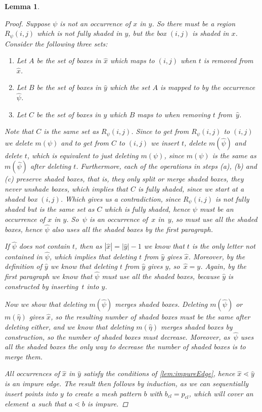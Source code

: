 \documentclass[preprint,11pt]{elsarticle}
\newtheorem{lem}[thm]{Lemma}\crefname{lem}{Lemma}{Lemmas}
\newcommand\cl[1]{#1_{cl}}
\numberwithin{equation}{section}
\numberwithin{figure}{section}
\numberwithin{thm}{section}
\begin{document}
\begin{lem}
\begin{proof}
Suppose $\psi$ is not an occurrence of $x$ in $y$. So there must be a region $R_\psi(i,j)$ which is not fully shaded in $y$,
 but the box $(i,j)$ is shaded in $x$. Consider the following three sets:
 \begin{enumerate}
 \item[(a)] Let $A$ be the set of boxes in $\hat{x}$ which maps to $(i,j)$ when $t$ is removed from $\hat{x}$. 
 \item[(b)] Let $B$ be the set of boxes in $\hat{y}$ which the set $A$ is mapped to by the occurrence $\hat{\psi}$.
 \item[(c)] Let $C$ be the set of boxes in $y$ which $B$ maps to when removing $t$ from~$\hat{y}$.
 \end{enumerate}
 Note that $C$ is the same set as $R_\psi(i,j)$. Since to get from $R_\psi(i,j)$ to $(i,j)$ we delete $m(\psi)$
 and to get from $C$ to $(i,j)$ we insert $t$, delete $m(\hat{\psi})$ and delete $t$,
 which is equivalent to just deleting $m(\psi)$, since $m(\psi)$ is the same as $m(\hat{\psi})$ after deleting $t$.
 Furthermore, each of the operations in steps (a), (b) and (c) preserve shaded boxes, that is, they only split or merge shaded boxes, they never unshade
 boxes, which implies that $C$ is fully shaded, since we start at a shaded box $(i,j)$. Which gives us a contradiction, since $R_\psi(i,j)$ is not fully shaded
 but is the same set as $C$ which is fully shaded, hence $\psi$ must be an occurrence of $x$ in $y$.
 So~$\psi$ is an occurrence of~$x$ in~$y$, so must use all the shaded boxes, hence $\hat{\psi}$ also uses
 all the shaded boxes by the first paragraph.

If $\hat{\psi}$ does not contain $t$, then as $|\hat{x}|=|\hat{y}|-1$ we know that $t$ is the only letter not contained in $\hat{\psi}$,
 which implies that deleting $t$ from $\hat{y}$ gives	
 $\hat{x}$. Moreover, by the definition of $\hat{y}$ we know that deleting $t$ from $\hat{y}$ gives $y$, so~$\hat{x}=y$. Again, by the first paragraph
 we know that $\hat{\psi}$ must use all the shaded boxes, because $\hat{y}$ is constructed by inserting~$t$ into $y$.

Now we show that deleting $m(\hat{\psi})$ merges shaded boxes. Deleting $m(\hat{\psi})$ or $m(\hat{\eta})$ gives $\hat{x}$,
 so the resulting number of shaded boxes must be the same after deleting either, and we know that deleting $m(\hat{\eta})$
 merges shaded boxes by construction, so the number of shaded boxes must decrease.
 Moreover, as~$\hat{\psi}$ uses all the shaded boxes the only way to decrease the number of shaded boxes is to merge them. 
 
All occurrences of $\hat{x}$ in $\hat{y}$ satisfy
 the conditions of \cref{lem:impureEdge}, hence $\hat{x}\lessdot\hat{y}$ is an impure edge.
 The result then follows by induction, as we can sequentially insert points into $y$
 to create a mesh pattern $b$ with $\cl{b}=\cl{p}$, which will cover an element~$a$
 such that $a\lessdot b$ is impure.
\end{proof}
\end{lem}
\end{document}
